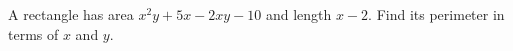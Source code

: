 A rectangle has area $x^2y+5x-2xy-10$ and length $x-2$. Find its perimeter in terms of $x$ and $y$.
